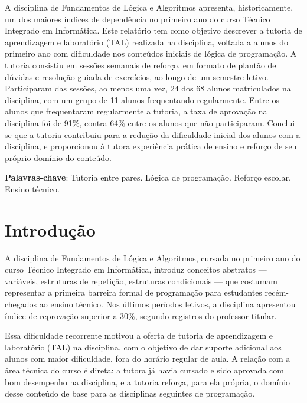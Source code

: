 \documentclass[article,12pt,a4paper]{abntex2}
\begin{document}
\maketitle

\begin{resumo}
A disciplina de Fundamentos de Lógica e Algoritmos apresenta,
historicamente, um dos maiores índices de dependência no primeiro ano do
curso Técnico Integrado em Informática. Este relatório tem como objetivo
descrever a tutoria de aprendizagem e laboratório (TAL) realizada na
disciplina, voltada a alunos do primeiro ano com dificuldade nos conteúdos
iniciais de lógica de programação. A tutoria consistiu em sessões
semanais de reforço, em formato de plantão de dúvidas e resolução guiada
de exercícios, ao longo de um semestre letivo. Participaram das sessões,
ao menos uma vez, 24 dos 68 alunos matriculados na disciplina, com um
grupo de 11 alunos frequentando regularmente. Entre os alunos que
frequentaram regularmente a tutoria, a taxa de aprovação na disciplina foi
de 91\%, contra 64\% entre os alunos que não participaram. Conclui-se que a
tutoria contribuiu para a redução da dificuldade inicial dos alunos com a
disciplina, e proporcionou à tutora experiência prática de ensino e
reforço de seu próprio domínio do conteúdo.

\vspace{\onelineskip}
\noindent
\textbf{Palavras-chave}: Tutoria entre pares. Lógica de programação. Reforço escolar. Ensino técnico.
\end{resumo}

\textual

\section{Introdução}

A disciplina de Fundamentos de Lógica e Algoritmos, cursada no primeiro
ano do curso Técnico Integrado em Informática, introduz conceitos
abstratos — variáveis, estruturas de repetição, estruturas condicionais —
que costumam representar a primeira barreira formal de programação para
estudantes recém-chegados ao ensino técnico. Nos últimos períodos letivos,
a disciplina apresentou índice de reprovação superior a 30\%, segundo
registros do professor titular.

Essa dificuldade recorrente motivou a oferta de tutoria de aprendizagem e
laboratório (TAL) na disciplina, com o objetivo de dar suporte adicional
aos alunos com maior dificuldade, fora do horário regular de aula. A
relação com a área técnica do curso é direta: a tutora já havia cursado e
sido aprovada com bom desempenho na disciplina, e a tutoria reforça, para
ela própria, o domínio desse conteúdo de base para as disciplinas
seguintes de programação.
\end{document}
